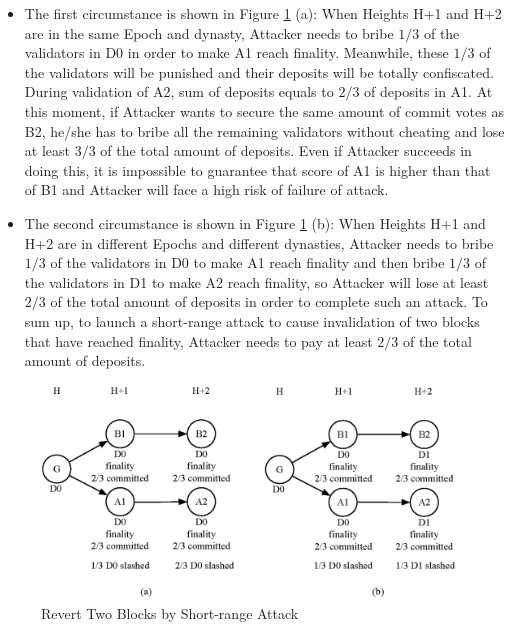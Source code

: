\begin{itemize}
\item The first circumstance is shown in Figure \ref{fig:revert2} (a): When Heights H+1 and H+2 are in the same Epoch and dynasty, Attacker needs to bribe $1/3$ of the validators in D0 in order to make A1 reach finality. Meanwhile, these $1/3$ of the validators will be punished and their deposits will be totally confiscated. During validation of A2, sum of deposits equals to $2/3$ of deposits in A1. At this moment, if Attacker wants to secure the same amount of commit votes as B2, he/she has to bribe all the remaining validators without cheating and lose at least $3/3$ of the total amount of deposits. Even if Attacker succeeds in doing this, it is impossible to guarantee that score of A1 is higher than that of B1 and Attacker will face a high risk of failure of attack. 

\item The second circumstance is shown in Figure \ref{fig:revert2} (b): When Heights H+1 and H+2 are in different Epochs and different dynasties, Attacker needs to bribe $1/3$ of the validators in D0 to make A1 reach finality and then bribe $1/3$ of the validators in D1 to make A2 reach finality, so Attacker will lose at least $2/3$ of the total amount of deposits in order to complete such an attack. To sum up, to launch a short-range attack to cause invalidation of two blocks that have reached finality, Attacker needs to pay at least $2/3$ of the total amount of deposits. 
\end{itemize}

\begin{figure}[h]
\centering
\includegraphics[width=11cm]{./figs/revert2}
\caption{Revert Two Blocks by Short-range Attack}
\label{fig:revert2}
\end{figure}

